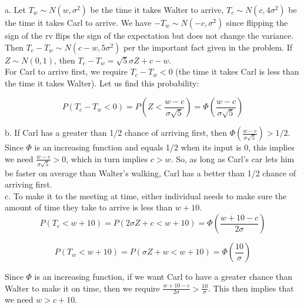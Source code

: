 a. Let \(T_{w} \sim N(w, \sigma^{2})\) be the time it takes Walter to arrive, \(T_{c} \sim N(c, 4\sigma^{2})\) be the time it takes Carl to arrive. We have \(-T_{w} \sim N(-c, \sigma^{2})\) since flipping the sign of the rv flips the sign of the expectation but does not change the variance. Then \(T_{c}-T_{w} \sim N(c-w, 5\sigma^{2})\) per the important fact given in the problem. If \(Z \sim N(0,1)\), then \(T_{c}-T_{w} = \sqrt{5}\sigma Z +c -w\).\\

For Carl to arrive first, we require \(T_{c}-T_{w} < 0\) (the time it takes Carl is less than the time it takes Walter). Let us find this probability:

\[P(T_{c}-T_{w} < 0) = P(Z < \frac{w-c}{\sigma \sqrt{5}}) = \Phi(\frac{w-c}{\sigma \sqrt{5}})\]

b. If Carl has a greater than 1/2 chance of arriving first, then \(\Phi(\frac{w-c}{\sigma \sqrt{5}}) > 1/2\). Since \(\Phi\) is an increasing function and equals 1/2 when its input is 0, this implies we need \(\frac{w-c}{\sigma \sqrt{5}} > 0\), which in turn implies \(c > w\). So, as long as Carl's car lets him be faster on average than Walter's walking, Carl has a better than 1/2 chance of arriving first. \\

c. To make it to the meeting at time, either individual needs to make sure the amount of time they take to arrive is less than \(w+10\).\\

\[P(T_{c} < w+10) = P(2\sigma Z +c < w+10) = \Phi(\frac{w+10-c}{2\sigma})\]

\[P(T_{w} < w+10) = P(\sigma Z + w < w+10) = \Phi(\frac{10}{\sigma})\]

Since \(\Phi\) is an increasing function, if we want Carl to have a greater chance than Walter to make it on time, then we require \(\frac{w+10-c}{2 \sigma} > \frac{10}{\sigma}\). This then implies that we need \(w > c+10\). 
